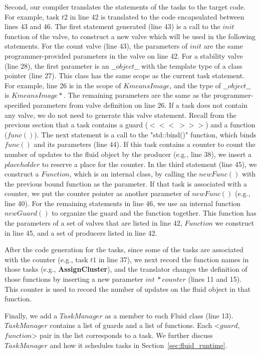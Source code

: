Second, our compiler translates the statements of the tasks to the target code. For example, task $t2$ in line 42 is translated to the code encapsulated between lines 43 and 46. The first statement generated (line 43) is a call to the $init$ function of the valve, to construct a new valve which will be used in the following statements. For the count valve (line 43), the parameters of $init$ are the same programmer-provided parameters in the valve on line 42. For a stability valve (line 28), the first parameter is an $\_\_object\_\_$ with the template type of a class pointer (line 27). This class has the same scope as the current task statement. For example, line 26 is in the scope of $KmeansImage$, and the type of $\_\_object\_\_$ is $KmeansImage*$. The remaining parameters are the same as the programmer-specified parameters from valve definition on line 26. If a task does not contain any valve, we do not need to generate this valve statement. Recall from the previous section that a task contains a guard ($<<<\ >>>$) and a function ($func()$). The next statement is a call to the "std::bind()" function, which binds $func()$ and its parameters (line 44). If this task contains a counter to count the number of updates to the fluid object by the producer (e.g., line 38), we insert a $placeholder$ to reserve a place for the counter. In the third statement (line 45), we construct a $Function$, which is an internal class, by calling the $newFunc()$ with the previous bound function as the parameter. If that task is associated with a counter, we put the counter pointer as another parameter of $newFunc()$ (e.g., line 40). For the remaining statements in line 46, we use an internal function $newGuard()$ to organize the guard and the function together. This function has the parameters of a set of valves that are listed in line 42, $Function$ we construct in line 45, and a set of producers listed in line 42.


After the code generation for the tasks, since some of the tasks are associated with the counter (e.g., task $t1$ in line 37), we next record the function names in those tasks (e.g., \textbf{AssignCluster}), and the translator changes the definition of those functions by inserting a new parameter $int\ *counter$ (lines 11 and 15). This counter is used to record the number of updates on the fluid object in that function.

Finally, we add a $TaskManager$ as a member to each Fluid class (line 13). $TaskManager$ contains a list of guards and a list of functions. Each <$guard$, $function$> pair in the list corresponds to a task. We further discuss $TaskManager$ and how it schedules tasks in Section~\ref{sec:fluid_runtime}.
